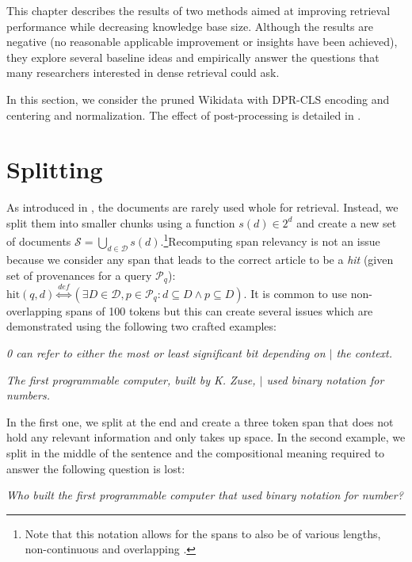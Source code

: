 This chapter describes the results of two methods aimed at improving retrieval performance while decreasing knowledge base size.
Although the results are negative (no reasonable applicable improvement or insights have been achieved), they explore several baseline ideas and empirically answer the questions that many researchers interested in dense retrieval could ask.

In this section, we consider the pruned Wikidata with DPR-CLS encoding and centering and normalization.
The effect of post-processing is detailed in . 
\section{Splitting}

As introduced in , the documents are rarely used whole for retrieval.
Instead, we split them into smaller chunks using a function $s(d) \in 2^d$ and create a new set of documents $\mathcal{S} = \bigcup_{d \in \mathcal{D}} s(d)$.\footnote{Note that this notation allows for the spans to also be of various lengths, non-continuous \splitExampleNoncontinuous and overlapping \splitExampleOverlap.}Recomputing span relevancy is not an issue because we consider any span that leads to the correct article to be a \emph{hit} (given set of provenances for a query $\mathcal{P}_q$): $\text{hit}(q, d) \overset{def}{\Leftrightarrow} (\exists D \in \mathcal{D}, p \in \mathcal{P}_q: d \subseteq D \wedge p \subseteq D)$.
It is common to use non-overlapping spans of 100 tokens \citep{karpukhin2020dense} but this can create several issues which are demonstrated using the following two crafted examples:

\begin{center}
\emph{0 can refer to either the most or least significant bit depending on $|$ the context.}

\emph{The first programmable computer, built by K. Zuse, $|$ used binary notation for numbers.}
\end{center}

In the first one, we split at the end and create a three token span that does not hold any relevant information and only takes up space.
In the second example, we split in the middle of the sentence and the compositional meaning required to answer the following question is lost:

\begin{center}
\emph{Who built the first programmable computer that used binary notation for number?}
\end{center}

